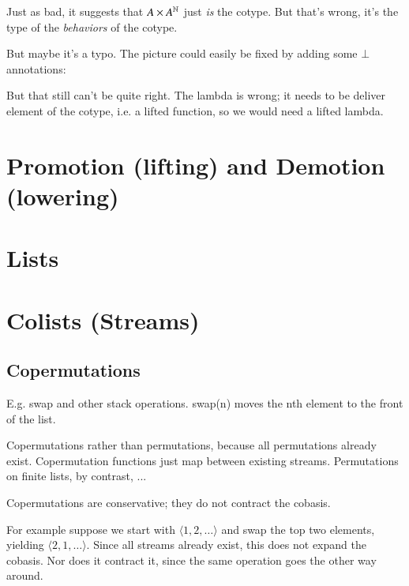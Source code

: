 Just as bad, it suggests that \(A\times{}A^{\mathbb{N}}\) just \textit{is}
the cotype. But that's wrong, it's the type of the \textit{behaviors}
of the cotype.

But maybe it's a typo. The picture could easily be fixed by adding some \(\bot\) annotations:

%

But that still can't be quite right. The lambda is wrong; it needs to
be deliver element of the cotype, i.e. a lifted function, so we would need
a lifted lambda.

\section{Promotion (lifting) and Demotion (lowering)}

\section{Lists}

\section{Colists (Streams)}

\subsection{Copermutations}

E.g. swap and other stack operations. swap(n) moves the nth element to
the front of the list.

Copermutations rather than permutations, because all permutations
already exist. Copermutation functions just map between existing
streams.  Permutations on finite lists, by contrast, ...

Copermutations are conservative; they do not contract the cobasis.

For example suppose we start with \(\langle 1,2,\ldots\rangle\) and swap the
top two elements, yielding \(\langle 2,1,\ldots\rangle\). Since all streams
already exist, this does not expand the cobasis. Nor does it contract
it, since the same operation goes the other way around.

